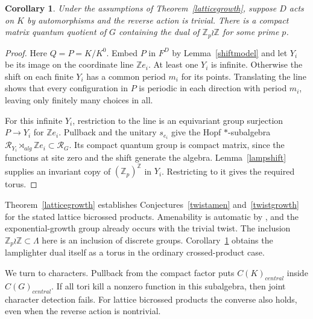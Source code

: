 \documentclass[11pt,a4paper]{article}
\newtheorem{cor}[thm]{Corollary}
\theoremstyle{remark}
\begin{document}
\begin{cor}\label{ordinaryrow}
Under the assumptions of Theorem~\ref{latticegrowth}, suppose $D$ acts
on $K$ by automorphisms and the reverse action is trivial. There is a
compact matrix quantum quotient of $G$ containing the dual of $\mathbb Z_p\wr\mathbb Z$
for some prime $p$.
\end{cor}
\begin{proof}
Here $Q=P=K/K^0$. Embed $P$ in $F^D$ by Lemma~\ref{shiftmodel} and let $Y_i$ be its
image on the coordinate line $\mathbb Z e_i$. At least one $Y_i$ is
infinite. Otherwise the shift on each finite $Y_i$ has a common period
$m_i$ for its points. Translating the line shows that every configuration
in $P$ is periodic in each direction with period $m_i$, leaving only
finitely many choices in all.

For this infinite $Y_i$, restriction to the line is an equivariant group
surjection $P\to Y_i$ for $\mathbb Z e_i$. Pullback and the unitary $s_{e_i}$
give the Hopf $*$-subalgebra
$\mathcal R_{Y_i}\rtimes_{alg}\mathbb Z e_i\subset
\mathcal R_G$. Its compact quantum group is compact matrix,
since the functions at site zero and the shift generate the algebra.
Lemma~\ref{lampshift} supplies an invariant copy of $(\mathbb Z_p)^{\mathbb Z}$
in $Y_i$. Restricting to it gives the required torus.
\end{proof}

Theorem~\ref{latticegrowth} establishes Conjectures~\ref{twistamen}
and~\ref{twistgrowth} for the stated lattice bicrossed products.
Amenability is automatic by \cite[Corollary~3.7]{fmp}, and the
exponential-growth group already occurs with the trivial twist. The
inclusion $\mathbb Z_p\wr\mathbb Z\subset\Lambda$ here is an inclusion of
discrete groups. Corollary~\ref{ordinaryrow} obtains the lamplighter
dual itself as a torus in the ordinary crossed-product case.

We turn to characters. Pullback from the compact factor puts
$C(K)_{central}$ inside $C(G)_{central}$. If all tori kill a nonzero function in
this subalgebra, then joint character detection fails. For lattice
bicrossed products the converse also holds, even when the reverse
action is nontrivial.
\end{document}

